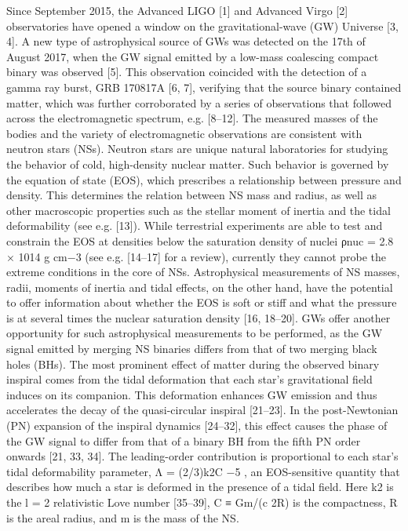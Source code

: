 \documentclass{ut-thesis}
\begin{document}
Since September 2015, the Advanced LIGO [1] and Advanced
Virgo [2] observatories have opened a window on
the gravitational-wave (GW) Universe [3, 4]. A new type
of astrophysical source of GWs was detected on the 17th of
August 2017, when the GW signal emitted by a low-mass
coalescing compact binary was observed [5]. This observation
coincided with the detection of a gamma ray burst,
GRB 170817A [6, 7], verifying that the source binary contained
matter, which was further corroborated by a series of
observations that followed across the electromagnetic spectrum,
e.g. [8–12]. The measured masses of the bodies and
the variety of electromagnetic observations are consistent
with neutron stars (NSs).
Neutron stars are unique natural laboratories for studying
the behavior of cold, high-density nuclear matter. Such
behavior is governed by the equation of state (EOS), which
prescribes a relationship between pressure and density.
This determines the relation between NS mass and radius,
as well as other macroscopic properties such as the
stellar moment of inertia and the tidal deformability (see
e.g. [13]). While terrestrial experiments are able to test and
constrain the EOS at densities below the saturation density
of nuclei ρnuc = 2.8 × 1014 g cm−3
(see e.g. [14–17] for
a review), currently they cannot probe the extreme conditions
in the core of NSs. Astrophysical measurements of
NS masses, radii, moments of inertia and tidal effects, on
the other hand, have the potential to offer information about
whether the EOS is soft or stiff and what the pressure is at
several times the nuclear saturation density [16, 18–20].
GWs offer another opportunity for such astrophysical
measurements to be performed, as the GW signal emitted
by merging NS binaries differs from that of two merging
black holes (BHs). The most prominent effect of matter
during the observed binary inspiral comes from the tidal
deformation that each star’s gravitational field induces on
its companion. This deformation enhances GW emission
and thus accelerates the decay of the quasi-circular inspiral
[21–23]. In the post-Newtonian (PN) expansion of the
inspiral dynamics [24–32], this effect causes the phase of
the GW signal to differ from that of a binary BH from the
fifth PN order onwards [21, 33, 34]. The leading-order contribution
is proportional to each star’s tidal deformability
parameter, Λ = (2/3)k2C
−5
, an EOS-sensitive quantity
that describes how much a star is deformed in the presence
of a tidal field. Here k2 is the l = 2 relativistic
Love number [35–39], C ≡ Gm/(c
2R) is the compactness,
R is the areal radius, and m is the mass of the NS.
\end{document}
